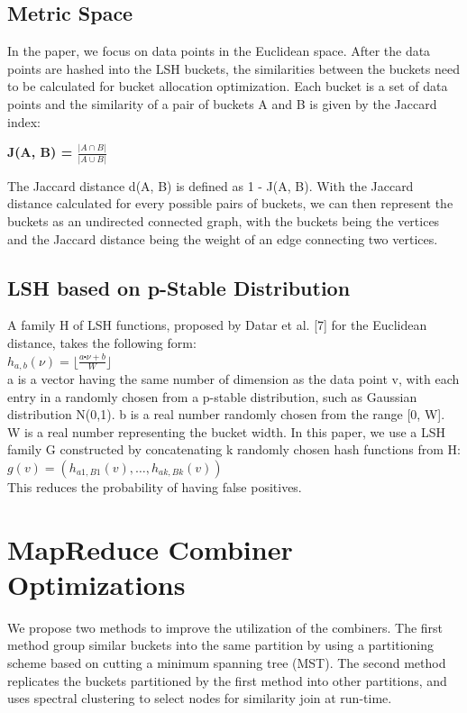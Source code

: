 \documentclass{vldb}
\begin{document}
\subsection{Metric Space}
In the paper, we focus on data points in the Euclidean space. After the data points are hashed into the LSH buckets, the similarities between the buckets need to be calculated for bucket allocation optimization. Each bucket is a set of data points and the similarity of a pair of buckets A and B is given by the Jaccard index:

\textbf{J(A, B) = $\frac{|A \cap B|}{|A \cup B|} $}

The Jaccard distance d(A, B) is defined as 1 - J(A, B). With the Jaccard distance calculated for every possible pairs of buckets, we can then represent the buckets as an undirected connected graph, with the buckets being the vertices and the Jaccard distance being the weight of an edge connecting two vertices.

\subsection{LSH based on p-Stable Distribution}
A family H of LSH functions, proposed by Datar et al. [7] for the Euclidean distance, takes the following form:\\
\indent\indent\indent\indent\indent\indent$h_{a,b}(\nu) = \lfloor \frac{a\centerdot\nu+b}{W}\rfloor$\\
a is a vector having the same number of dimension as the data point v, with each entry in a randomly chosen from a p-stable distribution, such as Gaussian distribution N(0,1). b is a real number randomly chosen from the range [0, W]. W is a real number representing the bucket width. In this paper, we use a LSH family G constructed by concatenating k randomly chosen hash functions from H:\\
\indent\indent\indent\indent\indent\indent$g(v) = ( h_{a1,B1}(v),\dots,h_{ak,Bk}(v))$\\
This reduces the probability of having false positives.


\section{MapReduce Combiner Optimizations}
We propose two methods to improve the utilization of the combiners. The first method group similar buckets into the same partition by using a partitioning scheme based on cutting a minimum spanning tree (MST). The second method replicates the buckets partitioned by the first method into other partitions, and uses spectral clustering to select nodes for similarity join at run-time.
\end{document}
